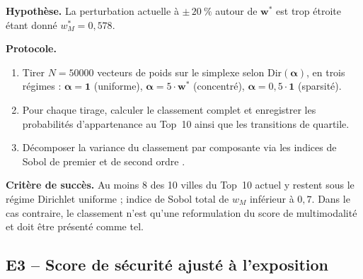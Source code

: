 \documentclass[11pt,a4paper]{article}
\begin{document}
\begin{experience}[title=E2 -- Test de résistance Dirichlet avec
décomposition de Sobol]
\textbf{Hypothèse.} La perturbation actuelle à $\pm\,\SI{20}{\percent}$
autour de $\mathbf{w}^{\ast}$ est trop étroite étant donné
$w_M^{\ast} = 0{,}578$.

\textbf{Protocole.}
\begin{enumerate}[leftmargin=*,itemsep=0.2em]
    \item Tirer $N = \num{50000}$ vecteurs de poids sur le
    simplexe selon $\mathrm{Dir}(\boldsymbol{\alpha})$, en trois
    régimes : $\boldsymbol{\alpha}=\mathbf{1}$ (uniforme),
    $\boldsymbol{\alpha}=5\cdot\mathbf{w}^{\ast}$ (concentré),
    $\boldsymbol{\alpha}=0{,}5\cdot\mathbf{1}$ (sparsité).
    \item Pour chaque tirage, calculer le classement complet et
    enregistrer les probabilités d'appartenance au Top~10 ainsi
    que les transitions de quartile.
    \item Décomposer la variance du classement par composante via
    les indices de Sobol de premier et de second ordre
    \citep{Saltelli2008}.
\end{enumerate}

\textbf{Critère de succès.} Au moins 8 des 10 villes du Top~10
actuel y restent sous le régime Dirichlet uniforme ; indice de
Sobol total de $w_M$ inférieur à $0{,}7$. Dans le cas contraire,
le classement n'est qu'une reformulation du score de multimodalité
et doit être présenté comme tel.
\end{experience}

\subsection{E3 -- Score de sécurité ajusté à l'exposition}
\end{document}
